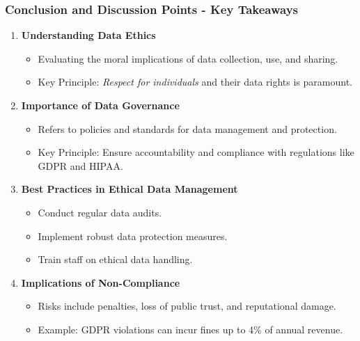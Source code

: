 \documentclass[aspectratio=169]{beamer}
\begin{document}
\begin{frame}[fragile]
    \frametitle{Conclusion and Discussion Points - Key Takeaways}
    \begin{enumerate}
        \item \textbf{Understanding Data Ethics}
        \begin{itemize}
            \item Evaluating the moral implications of data collection, use, and sharing.
            \item Key Principle: \textit{Respect for individuals} and their data rights is paramount.
        \end{itemize}
        
        \item \textbf{Importance of Data Governance}
        \begin{itemize}
            \item Refers to policies and standards for data management and protection.
            \item Key Principle: Ensure accountability and compliance with regulations like GDPR and HIPAA.
        \end{itemize}

        \item \textbf{Best Practices in Ethical Data Management}
        \begin{itemize}
            \item Conduct regular data audits.
            \item Implement robust data protection measures.
            \item Train staff on ethical data handling.
        \end{itemize}

        \item \textbf{Implications of Non-Compliance}
        \begin{itemize}
            \item Risks include penalties, loss of public trust, and reputational damage.
            \item Example: GDPR violations can incur fines up to 4\% of annual revenue.
        \end{itemize}
    \end{enumerate}
\end{frame}
\end{document}
